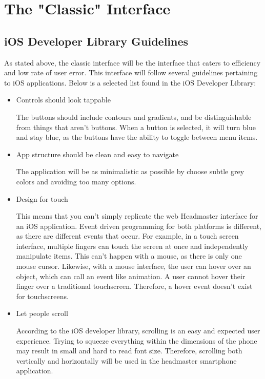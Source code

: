 \documentclass{article}
\begin{document}
\section{The "Classic" Interface}
\label{The "Classic" Interface}

\subsection{iOS Developer Library Guidelines}

As stated above, the classic interface will be the interface that caters to efficiency and low rate of user error.  This interface will follow several guidelines pertaining to iOS applications.  Below is a selected list found in the iOS Developer Library:\\

\begin{itemize}
\item  Controls should look tappable

The buttons should include contours and gradients, and be distinguishable from things that aren’t buttons.  When a button is selected, it will turn blue and stay blue, as the buttons have the ability to toggle between menu items.\\

\item App structure should be clean and easy to navigate

The application will be as minimalistic as possible by choose subtle grey colors and avoiding too many options.\\

\item Design for touch

This means that you can’t simply replicate the web Headmaster interface for an iOS application.  Event driven programming for both platforms is different, as there are different events that occur.  For example, in a touch screen interface, multiple fingers can touch the screen at once and independently manipulate items.  This can’t happen with a mouse, as there is only one mouse cursor.  Likewise, with a mouse interface, the user can hover over an object, which can call an event like animation.  A user cannot hover their finger over a traditional touchscreen.  Therefore, a hover event doesn’t exist for touchscreens.\\

\item Let people scroll

According to the iOS developer library, scrolling is an easy and expected user experience.  Trying to squeeze everything within the dimensions of the phone may result in small and hard to read font size.  Therefore, scrolling both vertically and horizontally will be used in the headmaster smartphone application.\\
\end{itemize}
\end{document}
